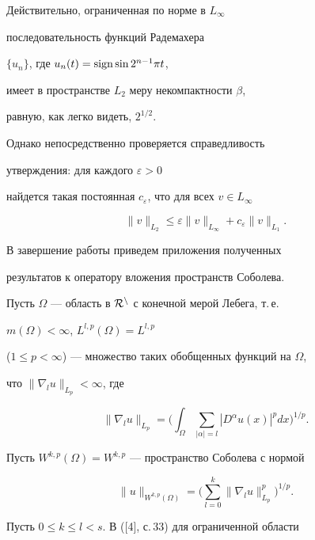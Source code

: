 Действительно, ограниченная по норме в $L_\infty$ 


последовательность функций Радемахера  


$\{u_n\}$, где $u_n(t)=\operatorname{sign}\sin 2^{n-1}\pi t$, 


имеет в пространстве $L_2$ меру некомпактности $\beta$,  


равную, как легко видеть, $2^{1/2}$.  


 


Однако непосредственно проверяется справедливость  


утверждения: для каждого $\varepsilon>0$ 


найдется такая постоянная $c_\varepsilon$, что для всех $v\in L_\infty$ 


$$ 


\|v\|_{L_2}\le\varepsilon\|v\|_{L_\infty}+ 


c_\varepsilon\|v\|_{L_1}. 


$$ 


 


В завершение работы приведем приложения полученных  


результатов к оператору вложения пространств Соболева. 


 


Пусть $\Omega$ --- область в $\cal R^n$ с конечной мерой Лебега, т.\,е. 


$m(\Omega)<\infty$, $L^{l,p}(\Omega)=L^{l,p}$ 


($1\le p<\infty$) --- множество таких обобщенных функций на $\Omega$, 


что $\|\nabla_l u\|_{L_p}<\infty$, где 


$$ 


\|\nabla_l u\|_{L_p}= 


\bigg(\int_\Omega\sum_{|\alpha|=l}|D^\alpha u(x)|^p 


dx \bigg)^{1/p}. 


$$ 


Пусть $W^{k,p}(\Omega)=W^{k,p}$ --- пространство Соболева с нормой 


$$ 


\|u\|_{W^{k,p}(\Omega)}= 


\bigg(\sum^k_{l=0}\|\nabla_l u\|^p_{L_p}\bigg)^{1/p}. 


$$ 


Пусть $0\le k\le l<s$. В ([4], с.\,33) для ограниченной области 


